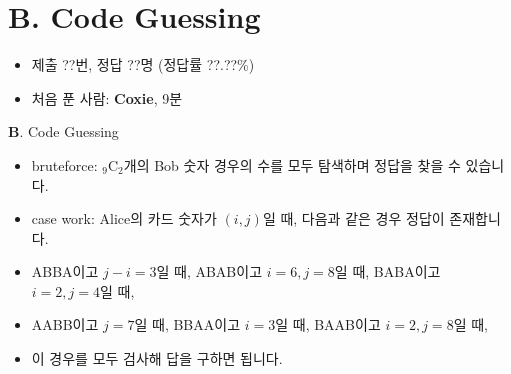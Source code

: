 \section{B. Code Guessing}

\begin{frame} %
    \begin{itemize}
        \item 제출 ??번, 정답 ??명 (정답률 ??.??\%)
        \item 처음 푼 사람: \textbf{Coxie}, 9분
    \end{itemize}
\end{frame}

\begin{frame}{\textbf{B}. Code Guessing}
    \begin{itemize}
        \item bruteforce: ${}_9 \mathrm{C}_2$개의 Bob 숫자 경우의 수를 모두 탐색하며 정답을 찾을 수 있습니다.
        \item case work: Alice의 카드 숫자가 $(i,j)$일 때, 다음과 같은 경우 정답이 존재합니다.
        \item ABBA이고 $j-i=3$일 때, ABAB이고 $i=6, j=8$일 때, BABA이고 $i=2, j=4$일 때,
        \item AABB이고 $j=7$일 때, BBAA이고 $i=3$일 때, BAAB이고 $i=2, j=8$일 때,
        \item 이 경우를 모두 검사해 답을 구하면 됩니다.
    \end{itemize}
\end{frame}